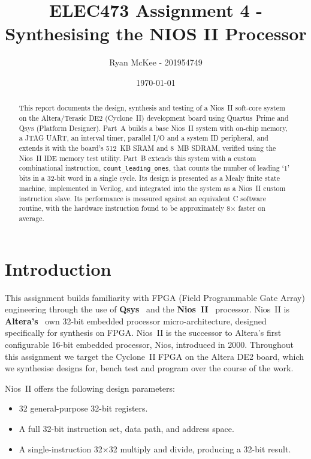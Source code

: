 \documentclass[
    12pt,
    a4paper
]{report}
\title{ELEC473 Assignment 4 - Synthesising the NIOS II Processor}
\date{\today}
\author{Ryan McKee - 201954749}
\begin{document}
\maketitle

\begin{abstract}
This report documents the design, synthesis and testing of a Nios~II soft-core system on the
Altera/Terasic DE2 (Cyclone~II) development board using Quartus~Prime and Qsys (Platform Designer).
Part~A builds a base Nios~II system with on-chip memory, a JTAG UART, an interval timer, parallel
I/O and a system ID peripheral, and extends it with the board's 512~KB SRAM and 8~MB SDRAM,
verified using the Nios~II IDE memory test utility. Part~B extends this system with a custom
combinational instruction, \texttt{count\_leading\_ones}, that counts the number of leading `1'
bits in a 32-bit word in a single cycle. Its design is presented as a Mealy finite state machine,
implemented in Verilog, and integrated into the system as a Nios~II custom instruction slave. Its
performance is measured against an equivalent C software routine, with the hardware instruction
found to be approximately 8$\times$ faster on average.
\end{abstract}

\tableofcontents

\chapter{Introduction}

This assignment builds familiarity with FPGA (Field Programmable Gate Array) engineering through
the use of \textbf{Qsys}~\cite{qsys} and the \textbf{Nios~II}~\cite{nios_ii} processor.
Nios~II is \textbf{Altera's}~\cite{altera} own 32-bit embedded processor micro-architecture,
designed specifically for synthesis on FPGA. Nios~II is the successor to Altera's first
configurable 16-bit embedded processor, Nios, introduced in 2000. Throughout this assignment we
target the Cyclone~II FPGA on the Altera DE2 board, which we synthesise designs for, bench test
and program over the course of the work.

Nios~II offers the following design parameters:
\begin{itemize}
    \item 32 general-purpose 32-bit registers.
    \item A full 32-bit instruction set, data path, and address space.
    \item A single-instruction 32$\times$32 multiply and divide, producing a 32-bit result.
\end{itemize}
\end{document}

